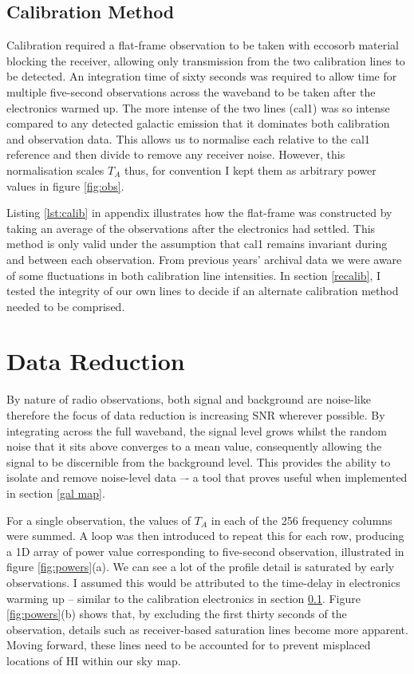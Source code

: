 \documentclass[a4paper]{jpconf}
\begin{document}
\begin{multicols}{2}
\subsection{Calibration Method} \label{calib}

Calibration required a flat-frame observation to be taken with eccosorb material blocking the receiver, allowing only transmission from the two calibration lines to be detected. An integration time of sixty seconds was required to allow time for multiple five-second observations across the waveband to be taken after the electronics warmed up. The more intense of the two lines (cal1) was so intense compared to any detected galactic emission that it dominates both calibration and observation data. This allows us to normalise each relative to the cal1 reference and then divide to remove any receiver noise. However, this normalisation scales $T_{A}$ thus, for convention I kept them as arbitrary power values in figure \ref{fig:obs}.

Listing \ref{lst:calib} in appendix illustrates how the flat-frame was constructed by taking an average of the observations after the electronics had settled. This method is only valid under the assumption that cal1 remains invariant during and between each observation. From previous years' archival data we were aware of some fluctuations in both calibration line intensities. In section \ref{recalib}, I tested the integrity of our own lines to decide if an alternate calibration method needed to be comprised.

\section{Data Reduction} \label{data reduction} 

By nature of radio observations, both signal and background are noise-like therefore the focus of data reduction is increasing SNR wherever possible. By integrating across the full waveband, the signal level grows whilst the random noise that it sits above converges to a mean value, consequently allowing the signal to be discernible from the background level. This provides the ability to isolate and remove noise-level data –- a tool that proves useful when implemented in section \ref{gal map}.

For a single observation, the values of $T_{A}$ in each of the 256 frequency columns were summed. A loop was then introduced to repeat this for each row, producing a 1D array of power value corresponding to five-second observation, illustrated in figure \ref{fig:powers}(a). We can see a lot of the profile detail is saturated by early observations. I assumed this would be attributed to the time-delay in electronics warming up -- similar to the calibration electronics in section \ref{calib}. Figure \ref{fig:powers}(b) shows that, by excluding the first thirty seconds of the observation, details such as receiver-based saturation lines become more apparent. Moving forward, these lines need to be accounted for to prevent misplaced locations of HI within our sky map.


\end{multicols}
\end{document}
